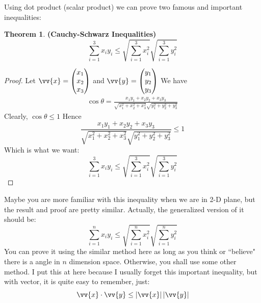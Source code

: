 \documentclass[12pt, a4paper, reqno]{amsart}
\theoremstyle{definition}
\newtheorem{theorem}{Theorem}[subsection] %
\numberwithin{equation}{section} %
\begin{document}
Using dot product (scalar product) we can prove two famous and important inequalities:
\begin{theorem}\label{Schwarz} \textbf{(Cauchy-Schwarz Inequalities)}
	\begin{equation}\label{E:Schwarz}
		\sum_{i=1}^{3} x_iy_i \le \sqrt{\sum_{i=1}^{3} x_i^2}\sqrt{\sum_{i=1}^{3} y_i^2}
	\end{equation}
\end{theorem}

\begin{proof}
	Let $\vv{x}=\begin{pmatrix}
		x_1\\
		x_2\\
		x_3
	\end{pmatrix}$
	and $\vv{y}=\begin{pmatrix}
		y_1\\
		y_2\\
		y_3
	\end{pmatrix}$ We have
	\begin{align*}
		\cos \theta = \frac{x_1y_1 + x_2y_2 + x_3y_3}
		{\sqrt{x_1^2 + x_2^2 + x_3^2}\sqrt{y_1^2 + y_2^2 + y_3^2}}
	\end{align*}
	Clearly, $\cos \theta \le 1$ Hence
	\begin{equation*}
		\frac{x_1y_1 + x_2y_2 + x_3y_3}
		{\sqrt{x_1^2 + x_2^2 + x_3^2}\sqrt{y_1^2 + y_2^2 + y_3^2}} \le 1
	\end{equation*}
	Which is what we want:
		\begin{equation*}
		\sum_{i=1}^{3} x_iy_i \le \sqrt{\sum_{i=1}^{3} x_i^2}\sqrt{\sum_{i=1}^{3} y_i^2}
	\end{equation*}
\end{proof}

Maybe you are more familiar with this inequality when we are in 2-D plane, but the result and proof are pretty similar. Actually, the generalized version of it should be:
\begin{equation}\label{E:GSchwarz}
	\sum_{i=1}^{n} x_iy_i \le \sqrt{\sum_{i=1}^{n} x_i^2}\sqrt{\sum_{i=1}^{n} y_i^2}
\end{equation}
You can prove it using the similar method here as long as you think or ``believe" there is a angle in $n$ dimension space. Otherwise, you shall use some other method. I put this at here because I usually forget this important inequality, but with vector, it is quite easy to remember, just:
\begin{equation}\label{SchwarzV}
	\vv{x}\cdot \vv{y} \le \left|\vv{x}\right|\left|\vv{y}\right|
\end{equation}
\end{document}
